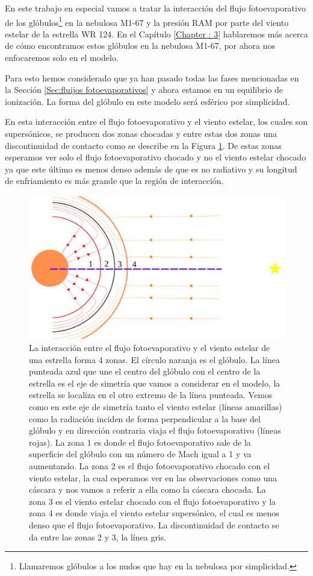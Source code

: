 \documentclass{book}
\begin{document}
En este trabajo en especial vamos a tratar la interacción del flujo fotoevaporativo de los glóbulos\footnote{Llamaremos glóbulos a los nudos que hay en la nebulosa por simplicidad.} en la nebulosa M1-67 y la presión RAM por parte del viento estelar de la estrella WR 124. En el Capítulo \ref{Chapter : 3} hablaremos más acerca de cómo encontramos estos glóbulos en la nebulosa M1-67, por ahora nos enfocaremos solo en el modelo.

Para esto hemos considerado que ya han pasado todas las fases mencionadas en la Sección \ref{Sec:fluijos fotoevaporativos} y ahora estamos en un equilibrio de ionización. La forma del glóbulo en este modelo será esférico por simplicidad.

En esta interacción entre el flujo fotoevaporativo y el viento estelar, los cuales son supersónicos, se producen dos zonas chocadas y entre estas dos zonas una discontinuidad de contacto como se describe en la Figura \ref{fig:zones}. De estas zonas esperamos ver solo el flujo fotoevaporativo chocado y no el viento estelar chocado ya que este último es menos denso además de que es no radiativo y su longitud de enfriamiento es más grande que la región de interacción.

\begin{figure}[htb]
    \centering    \includegraphics[width=\textwidth]{imagenes_corregidas/Arreglo 01.pdf}
    \caption{La interacción entre el flujo fotoevaporativo y el viento estelar de una estrella forma 4 zonas. El círculo naranja es el glóbulo. La línea punteada azul que une el centro del  glóbulo con el centro de la estrella es el eje de simetría que vamos a considerar en el modelo, la estrella se localiza en el otro extremo de la línea punteada. Vemos como en este eje de simetría tanto el viento estelar (líneas amarillas) como la radiación inciden de forma perpendicular a la base del glóbulo y en dirección contraria viaja el flujo fotoevaporativo (líneas rojas). La zona 1 es donde el flujo fotoevaporativo sale de la superficie del glóbulo con un número de Mach igual a 1 y va aumentando. La zona 2 es el flujo fotoevaporativo chocado con el viento estelar, la cual esperamos ver en las observaciones como una cáscara y nos vamos a referir a ella como la cáscara chocada. La zona 3 es el viento estelar chocado con el flujo fotoevaporativo y la zona 4 es donde viaja el viento estelar supersónico, el cual es menos denso que el flujo fotoevaporativo. La discontinuidad de contacto se da entre las zonas 2 y 3, la línea gris.}
    \label{fig:zones}
\end{figure}
\end{document}
